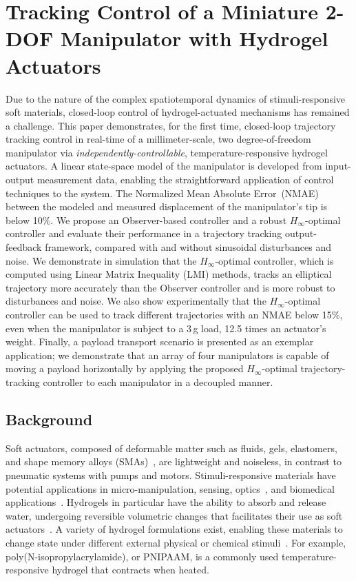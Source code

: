 \graphicspath{{Images/control/}}

\chapter{Tracking Control of a Miniature 2-DOF Manipulator with Hydrogel Actuators}
\label{chap:control}
Due to the nature of the complex spatiotemporal dynamics of stimuli-responsive soft materials, closed-loop control of hydrogel-actuated mechanisms has remained a challenge. This paper demonstrates, for the first time, closed-loop trajectory tracking control in real-time of a millimeter-scale, two degree-of-freedom manipulator via \emph{independently-controllable}, temperature-responsive hydrogel actuators. A linear state-space model of the manipulator is developed from input-output measurement data, enabling the straightforward application of control techniques to the system. The Normalized Mean Absolute Error~(NMAE) between the modeled and measured displacement of the manipulator's tip is below 10\%. We propose an Observer-based controller and a robust $H_{\infty}$-optimal controller and evaluate their 
performance in a trajectory tracking output-feedback framework, compared with and without sinusoidal disturbances and noise. We demonstrate in simulation that the $H_\infty$-optimal controller, which is computed using Linear Matrix Inequality (LMI) methods, tracks an elliptical trajectory more accurately than the Observer controller and is more robust to disturbances and noise. We also show experimentally that the $H_\infty$-optimal controller can be used to track different trajectories with an NMAE below 15$\%$, even when the manipulator is subject to a 3\,g load, 12.5 times an actuator's weight. Finally, a payload transport scenario is presented as an exemplar application; we demonstrate that an array of four manipulators is capable of moving a payload horizontally by applying the proposed $H_\infty$-optimal trajectory-tracking controller to each manipulator in a decoupled manner.
\section{Background}
Soft actuators, composed of deformable matter such as fluids, gels, elastomers, and shape memory alloys (SMAs)~\cite{majidi2014soft}, are lightweight and noiseless, in contrast to pneumatic systems with pumps and motors. Stimuli-responsive materials have  potential applications in micro-manipulation, sensing, optics~\cite{bacelar2017smart,qin2019bioinspired}, and biomedical applications~\cite{guiseppi2010electroconductive}. Hydrogels in particular have the ability to absorb and release water, undergoing reversible volumetric changes that facilitates their use as soft actuators~\cite{mishra2020autonomic}. A variety of hydrogel formulations exist, enabling these materials to change state under different external physical or chemical stimuli~\cite{peng2018thermoresponsive,he2012synthetic}. For example, poly(N-isopropylacrylamide), or PNIPAAM, is a commonly used temperature-responsive hydrogel that contracts when heated.

